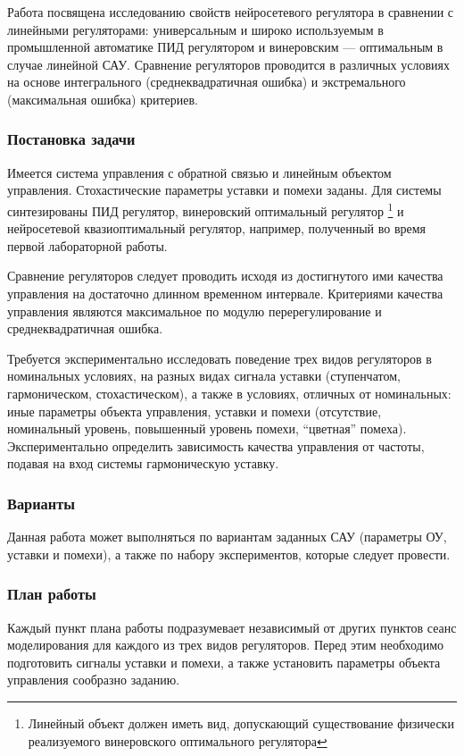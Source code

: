 Работа посвящена исследованию свойств нейросетевого регулятора в
сравнении с линейными регуляторами: универсальным и широко
используемым в промышленной автоматике ПИД регулятором и винеровским
--- оптимальным в случае линейной САУ.  Сравнение регуляторов
проводится в различных условиях на основе интегрального
(среднеквадратичная ошибка) и экстремального (максимальная ошибка)
критериев.

\subsubsection{Постановка задачи}

Имеется система управления с обратной связью и линейным объектом
управления.  Стохастические параметры уставки и помехи заданы.  Для
системы синтезированы ПИД регулятор, винеровский оптимальный регулятор
\footnote{Линейный объект должен иметь вид, допускающий существование
  физически реализуемого винеровского оптимального регулятора} и
нейросетевой квазиоптимальный регулятор, например, полученный во время
первой лабораторной работы.

Сравнение регуляторов следует проводить исходя из достигнутого ими
качества управления на достаточно длинном временном интервале.
Критериями качества управления являются максимальное по модулю
перерегулирование и среднеквадратичная ошибка.

Требуется экспериментально исследовать поведение трех видов
регуляторов в номинальных условиях, на разных видах сигнала уставки
(ступенчатом, гармоническом, стохастическом), а также в условиях,
отличных от номинальных: иные параметры объекта управления, уставки и
помехи (отсутствие, номинальный уровень, повышенный уровень помехи,
``цветная'' помеха).  Экспериментально определить зависимость качества
управления от частоты, подавая на вход системы гармоническую уставку.

\subsubsection{Варианты}

Данная работа может выполняться по вариантам заданных САУ (параметры
ОУ, уставки и помехи), а также по набору экспериментов, которые
следует провести.

\subsubsection{План работы}

Каждый пункт плана работы подразумевает независимый от других пунктов
сеанс моделирования для каждого из трех видов регуляторов.  Перед этим
необходимо подготовить сигналы уставки и помехи, а также установить
параметры объекта управления сообразно заданию.

